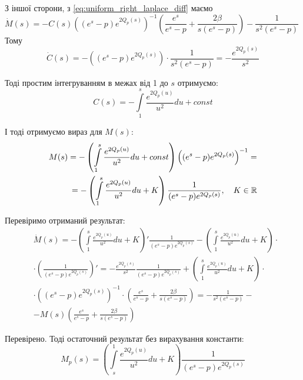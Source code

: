 З іншої сторони, з \eqref{eq:uniform_right_laplace_diff} маємо
$$
	 \dot M(s) = - C(s) \left((e^s - p)  e^{2Q_p(s)}\right)^{-1}  \left(\frac{e^s}{e^s - p} + \frac{2\beta}{s(e^s - p)}\right) - \frac{1}{s^2(e^s - p)} \quad	
$$
Тому
$$
	\dot C(s) = - \left((e^s - p)  e^{2Q_p(s)}\right) \cdot  \frac{1}{s^2(e^s - p)} =  - \frac{e^{2Q_p(s)}}{s^2}
$$

Тоді простим інтегруванням в межах від 1 до $s$ отримуємо:
\begin{equation}
	C(s) = -  \int\limits_1^s \frac{e^{2Q_p(u)}}{u^2} du + const
\end{equation}

І тоді отримуємо вираз для $M(s)$:
\begin{equation}
\begin{split}
	M(s)=- \left( \int\limits_1^s \frac{e^{2Q_p(u)}}{u^2} du + const \right) \left((e^s - p)  e^{2Q_p(s)}\right)^{-1}  =\\
	= - \left( \int\limits_1^s \frac{e^{2Q_p(u)}}{u^2} du + K \right) \frac{1}{(e^s - p)  e^{2Q_p(s)}}, \quad K \in \mathbb{R}
\end{split}
\end{equation}

Перевіримо отриманий результат:
\begin{equation*}
\begin{split}
	&\dot M(s) = -\left( \int\limits_1^s \frac{e^{2Q_p(u)}}{u^2} du + K \right)' \frac{1}{(e^s - p)  e^{2Q_p(s)}} -\left( \int\limits_1^s \frac{e^{2Q_p(u)}}{u^2} du + K \right)\cdot \\ 
	&\cdot \left(\frac{1}{(e^s - p)  e^{2Q_p(s)}}\right)' = -\frac{e^{2Q_p(s)}}{s^2} \frac{1}{(e^s - p)  e^{2Q_p(s)}}  + \left( \int\limits_1^s \frac{e^{2Q_p(u)}}{u^2} du + K \right) \cdot \\
	& \cdot \left((e^s - p)  e^{2Q_p(s)}\right)^{-1} \cdot \left(\frac{e^s}{e^s - p}  + \frac{2\beta}{s(e^s - p)}   \right)= -\frac{1}{s^2(e^s - p)} -\\
	&- M(s)\left(\frac{e^s}{e^s - p}  + \frac{2\beta}{s(e^s - p)}   \right)
\end{split}
\end{equation*}

Перевірено. Тоді остаточний результат без вирахування константи:
\begin{equation}
	\label{eq:uniform_right_laplace_sol_initial}
	M_p(s)= \left( \int\limits_s^1 \frac{e^{2Q_p(u)}}{u^2} du + K \right) \frac{1}{(e^s - p)  e^{2Q_p(s)}}
\end{equation}

